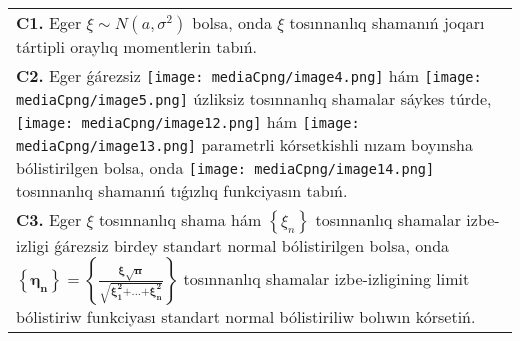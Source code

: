 \documentclass{article}
\begin{document}
\begin{tabular}{m{17cm}}
 \\
\textbf{C1.} Eger \(\xi\sim N\left( a,\sigma^{2} \right)\) bolsa, onda \(\xi\) tosınnanlıq shamanıń joqarı tártipli oraylıq momentlerin tabıń.
 \\
\textbf{C2.} Eger ǵárezsiz \texttt{[image: mediaCpng/image4.png]} hám \texttt{[image: mediaCpng/image5.png]} úzliksiz tosınnanlıq shamalar sáykes túrde, \texttt{[image: mediaCpng/image12.png]} hám \texttt{[image: mediaCpng/image13.png]} parametrli kórsetkishli nızam boyınsha bólistirilgen bolsa, onda \texttt{[image: mediaCpng/image14.png]} tosınnanlıq shamanıń tıǵızlıq funkciyasın tabıń.
 \\
\textbf{C3.} 
Eger \(\xi\) tosınnanlıq shama hám \(\left\{ \xi_{n} \right\}\) tosınnanlıq shamalar izbe-izligi ǵárezsiz birdey standart normal bólistirilgen bolsa, onda \(\left\{ \mathbf{\eta}_{\mathbf{n}} \right\}\mathbf{=}\left\{ \frac{\mathbf{\xi}\sqrt{\mathbf{n}}}{\sqrt{\mathbf{\xi}_{\mathbf{1}}^{\mathbf{2}}\mathbf{+}\mathbf{...}\mathbf{+}\mathbf{\xi}_{\mathbf{n}}^{\mathbf{2}}}} \right\}\) tosınnanlıq shamalar izbe-izligining limit bólistiriw funkciyası standart normal bólistiriliw bolıwın kórsetiń.
 \\

\end{tabular}
\vspace{1cm}
\end{document}
